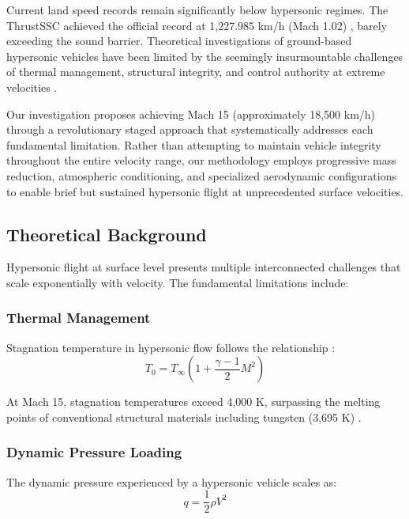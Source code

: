 \documentclass[12pt,a4paper]{article}
\begin{document}
Current land speed records remain significantly below hypersonic regimes. The ThrustSSC achieved the official record at 1,227.985 km/h (Mach 1.02) \cite{noble1999land}, barely exceeding the sound barrier. Theoretical investigations of ground-based hypersonic vehicles have been limited by the seemingly insurmountable challenges of thermal management, structural integrity, and control authority at extreme velocities \cite{hallion1995hypersonic, mcclinton2005scramjet}.

Our investigation proposes achieving Mach 15 (approximately 18,500 km/h) through a revolutionary staged approach that systematically addresses each fundamental limitation. Rather than attempting to maintain vehicle integrity throughout the entire velocity range, our methodology employs progressive mass reduction, atmospheric conditioning, and specialized aerodynamic configurations to enable brief but sustained hypersonic flight at unprecedented surface velocities.

\subsection{Theoretical Background}

Hypersonic flight at surface level presents multiple interconnected challenges that scale exponentially with velocity. The fundamental limitations include:

\subsubsection{Thermal Management}
Stagnation temperature in hypersonic flow follows the relationship \cite{anderson2006hypersonic}:
\begin{equation}
T_0 = T_\infty \left(1 + \frac{\gamma-1}{2}M^2\right)
\label{eq:stagnation_temp}
\end{equation}

At Mach 15, stagnation temperatures exceed 4,000 K, surpassing the melting points of conventional structural materials including tungsten (3,695 K) \cite{lide2005crc}.

\subsubsection{Dynamic Pressure Loading}
The dynamic pressure experienced by a hypersonic vehicle scales as:
\begin{equation}
q = \frac{1}{2}\rho V^2
\label{eq:dynamic_pressure}
\end{equation}
\end{document}
